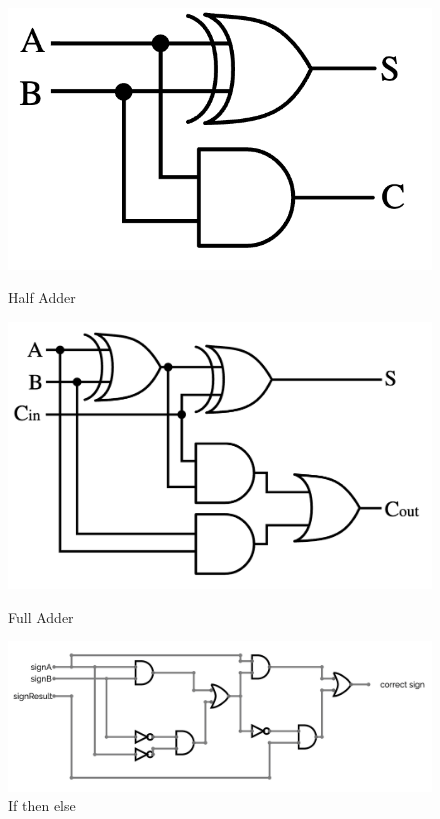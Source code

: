 \documentclass[12pt]{article}
\begin{document}
\begin{figure}[!htb]
    \begin{center}
        \begin{minipage}{0.4\textwidth}
            \centering
            \includegraphics[width=.7\linewidth]{../src/images/Half_adder.png}
            \caption{Half Adder}\label{half}
        \end{minipage}
        \hfill
        \begin{minipage}{0.4\textwidth}
            \centering
            \includegraphics[width=.8\linewidth]{../src/images/Full-adder.png}
            \caption{Full Adder}\label{full}
        \end{minipage}
        \hfill
        \hfill
        \begin{minipage}{0.5\textwidth}
            \centering
            \includegraphics[width=1.2\linewidth]{../src/images/overflow.png}
            \caption{If then else}\label{overflow}
        \end{minipage}
    \end{center}
\end{figure}
\end{document}
